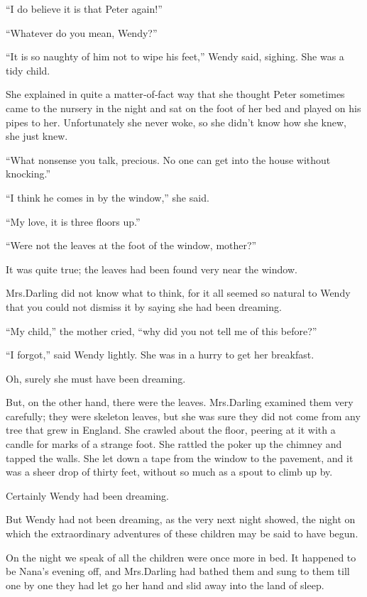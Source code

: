 “I do believe it is that Peter again!”

“Whatever do you mean, Wendy?”

“It is so naughty of him not to wipe his feet,” Wendy said, sighing.
She was a tidy child.

She explained in quite a matter‐of‐fact way
that she thought Peter sometimes came to the nursery in the night
and sat on the foot of her bed and played on his pipes to her.
Unfortunately she never woke, so she didn’t know how she knew, she just knew.

“What nonsense you talk, precious.
No one can get into the house without knocking.”

“I think he comes in by the window,” she said.

“My love, it is three floors up.”

“Were not the leaves at the foot of the window, mother?”

It was quite true;
the leaves had been found very near the window.

Mrs.\@ Darling did not know what to think,
for it all seemed so natural to Wendy that you could not dismiss it by saying she had been dreaming.

“My child,” the mother cried, “why did you not tell me of this before?”

“I forgot,” said Wendy lightly.
She was in a hurry to get her breakfast.

Oh, surely she must have been dreaming.

But, on the other hand, there were the leaves.
Mrs.\@ Darling examined them very carefully;
they were skeleton leaves, but she was sure they did not come from any tree that grew in England.
She crawled about the floor, peering at it with a candle for marks of a strange foot.
She rattled the poker up the chimney and tapped the walls.
She let down a tape from the window to the pavement,
and it was a sheer drop of thirty feet, without so much as a spout to climb up by.

Certainly Wendy had been dreaming.

But Wendy had not been dreaming,
as the very next night showed,
the night on which the extraordinary adventures of these children may be said to have begun.

On the night we speak of all the children were once more in bed.
It happened to be Nana’s evening off,
and Mrs.\@ Darling had bathed them and sung to them till
one by one they had let go her hand and slid away into the land of sleep.

